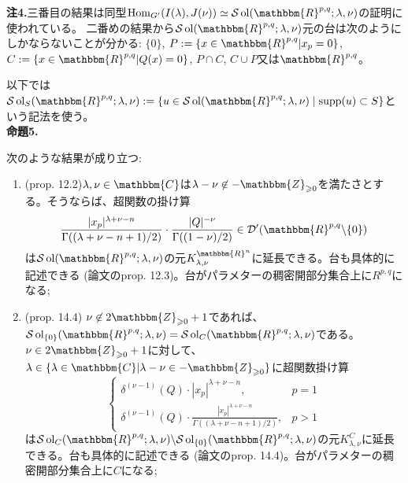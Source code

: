\documentclass[a4paper]{article} %
\newcommand{\assign}{:=}
\newcommand{\nin}{\not\in}
\newcommand{\tmop}[1]{\ensuremath{\operatorname{#1}}}
\newcommand{\tmtextbf}[1]{{\bfseries{#1}}}
\newcommand{\tmtextit}[1]{{\itshape{#1}}}
\begin{document}
{\noindent}\tmtextbf{注\textbf{4}.}三番目の結果は同型$\tmop{Hom}_{G'} ( I ( \lambda), J ( \nu)) \simeq
\mathcal{S} \tmop{ol} ( \mathbbm{R}^{p, q} ; \lambda, \nu)$の証明に使われている。
二番めの結果から$\mathcal{S} \tmop{ol} (
\mathbbm{R}^{p, q} ; \lambda, \nu)$元の台は次のようにしかならないことが分かる: $\{ 0
\}$, $P \assign \{ x \in \mathbbm{R}^{p, q} | x_p = 0 \}$, $C \assign \{ x \in
\mathbbm{R}^{p, q} | Q ( x) = 0 \}$, $P \cap C$, $C \cup P$又は$\mathbbm{R}^{p, q}$。

以下では$\mathcal{S} \tmop{ol}_S ( \mathbbm{R}^{p,
q} ; \lambda, \nu):=\{u\in\mathcal{S} \tmop{ol} ( \mathbbm{R}^{p,
q} ; \lambda, \nu)\mid \supp(u)\subset S\}$という記法を使う。\\

{\noindent}\tmtextbf{命題\textbf{5}.}\tmtextit{次のような結果が成り立つ:
\begin{enumerate}
 \item (prop. 12.2)$\lambda, \nu \in \mathbbm{C}$は$\lambda - \nu \nin -\mathbbm{Z}_{\geqslant 0}$を満たさとする。そうならば、超関数の掛け算
 \[ \frac{| x_p |^{\lambda + \nu - n}}{\Gamma ( ( \lambda + \nu - n + 1) /
 2)} \cdot \frac{| Q |^{- \nu}}{\Gamma ( ( 1 - \nu) / 2)} \in \mathcal{D}'
 ( \mathbbm{R}^{p, q} \backslash \{ 0 \}) \]
 は$\mathcal{S} \tmop{ol} (
 \mathbbm{R}^{p, q} ; \lambda, \nu)$の元$K_{\lambda, \nu}^{\mathbbm{R}^n}$に延長できる。台も具体的に記述できる
 (論文のprop. 12.3)。台がパラメターの稠密開部分集合上に$R^{p,q}$になる;
 
 \item (prop. 14.4) $\nu \nin
 2\mathbbm{Z}_{\geqslant 0} + 1$であれば、$\mathcal{S} \tmop{ol}_{\{ 0 \}} (
 \mathbbm{R}^{p, q} ; \lambda, \nu) =\mathcal{S} \tmop{ol}_C (
 \mathbbm{R}^{p, q} ; \lambda, \nu)$である。$\nu \in
 2\mathbbm{Z}_{\geqslant 0} + 1$に対して、$\lambda \in \{ \lambda \in
 \mathbbm{C} | \lambda - \nu \in -\mathbbm{Z}_{\geqslant 0} \}$に超関数掛け算
 \[ \left\{ \begin{array}{ll}
 \delta^{( \nu - 1)} ( Q) \cdot | x_p |^{\lambda + \nu - n}, & p = 1\\
 \delta^{( \nu - 1)} ( Q) \cdot \frac{| x_p |^{\lambda + \nu -
 n}}{\Gamma ( ( \lambda + \nu - n + 1) / 2)}, & p > 1
 \end{array} \right. \]
 は$\mathcal{S} \tmop{ol}_C (
 \mathbbm{R}^{p, q} ; \lambda, \nu) \backslash\mathcal{S} \tmop{ol}_{\{ 0 \}}
 ( \mathbbm{R}^{p, q} ; \lambda, \nu)$の元$K_{\lambda, \nu}^C$に延長できる。台も具体的に記述できる
 (論文のprop. 14.4)。台がパラメターの稠密開部分集合上に$C$になる;
 

\end{enumerate}}
\end{document}
